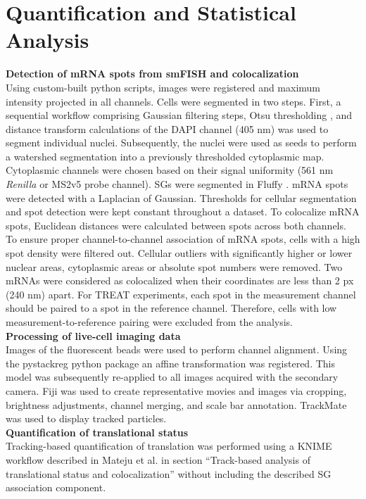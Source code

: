 \section{Quantification and Statistical Analysis}

\textbf{Detection of mRNA spots from smFISH and colocalization} \\
Using custom-built python scripts, images were registered and maximum intensity projected in all channels.
Cells were segmented in two steps.
First, a sequential workflow comprising Gaussian filtering steps, Otsu thresholding \cite{otsu_threshold_1979}, and distance transform calculations of the DAPI channel (405 nm) was used to segment individual nuclei.
Subsequently, the nuclei were used as seeds to perform a watershed segmentation into a previously thresholded cytoplasmic map.
Cytoplasmic channels were chosen based on their signal uniformity (561 nm \textit{Renilla} or MS2v5 probe channel).
SGs were segmented in Fluffy \cite{eichenberger_fluffy_2020}.
mRNA spots were detected with a Laplacian of Gaussian.
Thresholds for cellular segmentation and spot detection were kept constant throughout a dataset.
To colocalize mRNA spots, Euclidean distances were calculated between spots across both channels.
To ensure proper channel-to-channel association of mRNA spots, cells with a high spot density were filtered out.
Cellular outliers with significantly higher or lower nuclear areas, cytoplasmic areas or absolute spot numbers were removed.
Two mRNAs were considered as colocalized when their coordinates are less than 2 px (240 nm) apart.
For TREAT experiments, each spot in the measurement channel should be paired to a spot in the reference channel.
Therefore, cells with low measurement-to-reference pairing were excluded from the analysis.
\\

\textbf{Processing of live-cell imaging data} \\
Images of the fluorescent beads were used to perform channel alignment.
Using the pystackreg python package \cite{thevenaz_pyramid_1998} an affine transformation was registered.
This model was subsequently re-applied to all images acquired with the secondary camera.
Fiji \cite{schindelin_fiji_2012} was used to create representative movies and images via cropping, brightness adjustments, channel merging, and scale bar annotation.
TrackMate \cite{tinevez_trackmate:_2017} was used to display tracked particles.
\\

\textbf{Quantification of translational status} \\
Tracking-based quantification of translation was performed using a KNIME \cite{berthold_knime_2009} workflow described
    in Mateju et al. \cite{mateju_single-molecule_2020} in section “Track-based analysis of translational status and colocalization” without including the described SG association component.
\\

